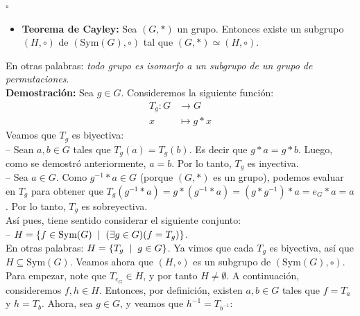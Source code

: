 \documentclass[10 pt]{article}
\begin{document}
\begin{flushright}
    $\square$
\end{flushright}

\begin{itemize}
    \item \Large{\textbf{Teorema de Cayley:} Sea $(G,*)$ un grupo. Entonces existe un subgrupo $(H,\circ)$ de $(\text{Sym}(G),\circ)$ tal que $(G,*) \simeq (H,\circ)$.} \\
\end{itemize}

\Large{En otras palabras: \textit{todo grupo es isomorfo a un subgrupo de un grupo de permutaciones}.} \\

\Large{\textbf{Demostración:} Sea $g \in G$. Consideremos la siguiente función:}
\begin{align*}
    T_g:G &\rightarrow G \\
    x &\mapsto g*x
\end{align*}
\Large{Veamos que $T_g$ es biyectiva: \\

-- Sean $a,b \in G$ tales que $T_g(a)=T_g(b)$. Es decir que $g*a=g*b$. Luego, como se demostró anteriormente, $a=b$. Por lo tanto, $T_g$ es inyectiva. \\

-- Sea $a \in G$. Como $g^{-1}*a \in G$ (porque $(G,*)$ es un grupo), podemos evaluar en $T_g$ para obtener que $T_g(g^{-1}*a)=g*(g^{-1}*a)=(g*g^{-1})*a=e_G*a=a$. Por lo tanto, $T_g$ es sobreyectiva. \\

Así pues, tiene sentido considerar el siguiente conjunto: \\

-- $H=\{f \in \text{Sym}(G) \hspace{0.2 cm}|\hspace{0.2 cm}(\exists g \in G)(f=T_g)\}$. \\

En otras palabras: $H=\{T_g \hspace{0.2 cm}|\hspace{0.2 cm}g \in G\}$. Ya vimos que cada $T_g$ es biyectiva, así que $H \subseteq \text{Sym}(G)$. Veamos ahora que $(H,\circ)$ es un subgrupo de $(\text{Sym}(G),\circ)$. Para empezar, note que $T_{e_G} \in H$, y por tanto $H \neq \emptyset$. A continuación, consideremos $f,h \in H$. Entonces, por definición, existen $a,b \in G$ tales que $f=T_a$ y $h=T_b$. Ahora, sea $g \in G$, y veamos que $h^{-1}=T_{b^{-1}}$:}
\end{document}
